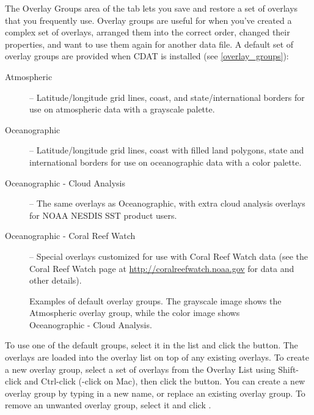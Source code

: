 The {\gui Overlay Groups} area of the tab lets you save and
restore a set of overlays that you frequently use.  Overlay
groups are useful for when you've created a complex set of
overlays, arranged them into the correct order, changed their
properties, and want to use them again for another data file.  A
default set of overlay groups are provided when CDAT is installed
(see \autoref{overlay_groups}):
\begin{description}

\item[{\gui Atmospheric}] -- Latitude/longitude grid lines, coast,
and state/international borders for use on atmospheric data with
a grayscale palette.

\item[{\gui Oceanographic}] -- Latitude/longitude grid lines,
coast with filled land polygons, state and international borders
for use on oceanographic data with a color palette.

\item[{\gui Oceanographic - Cloud Analysis}] -- The same overlays
as Oceanographic, with extra cloud analysis overlays for NOAA
NESDIS SST product users.

\item[{\gui Oceanographic - Coral Reef Watch}] -- Special overlays
customized for use with Coral Reef Watch data (see the Coral Reef
Watch page at \url{http://coralreefwatch.noaa.gov} for data and
other details).

\end{description}

\begin{figure}
  \begin{center}
    \caption[Examples of default overlay groups]{
       Examples of default overlay groups.  The grayscale image
       shows the {\gui Atmospheric} overlay group, while the color image
       shows {\gui Oceanographic - Cloud Analysis}.
    }
    \label{overlay_groups}
  \end{center}
\end{figure}

To use one of the default groups, select it in the list and click
the  button.  The overlays are
loaded into the overlay list on top of any existing overlays.  To
create a new overlay group, select a set of overlays from the
{\gui Overlay List} using Shift-click and Ctrl-click
(-click on Mac), then click the
 button.  You can create a new
overlay group by typing in a new name, or replace an existing
overlay group.  To remove an unwanted overlay group, select it
and click .

